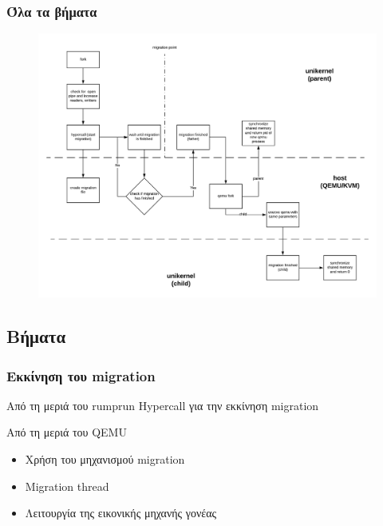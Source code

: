 \documentclass[red,slidestop,notes,compress,mathserif]{beamer}
\begin{document}
\begin{frame}
\frametitle{Όλα τα βήματα}
\begin{figure}
\center
\includegraphics[scale=0.38]{figures/fork_olo.png}
\end{figure}
\end{frame}

\subsection{Βήματα}


\begin{frame}
\frametitle{Εκκίνηση του migration}
\begin{block}{Από τη μεριά του rumprun}
Hypercall για την εκκίνηση migration 
\end{block}
\begin{block}{Από τη μεριά του QEMU}
\begin{itemize}
\item Χρήση του μηχανισμού migration
\item Migration thread
\item Λειτουργία της εικονικής μηχανής γονέας
\end{itemize}
\end{block}
\end{frame}
\end{document}
